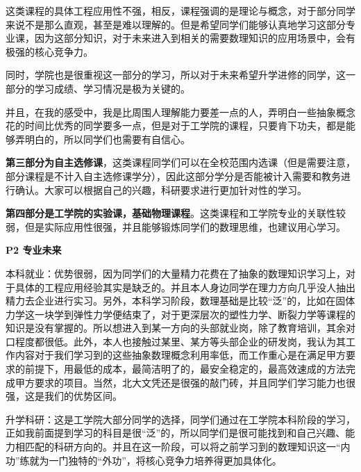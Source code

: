 \documentclass[11pt,oneside]{book}
\begin{document}
这类课程的具体工程应用性不强，相反，课程强调的是理论与概念，对于部分同学来说不是那么直观，甚至是难以理解的。但是希望同学们能够认真地学习这部分专业课，因为这部分知识，对于未来进入到相关的需要数理知识的应用场景中，会有极强的核心竞争力。

\vspace{10pt}

同时，学院也是很重视这一部分的学习，所以对于未来希望升学进修的同学，这一部分的学习成绩、学习情况是极为关键的。

\vspace{10pt}

并且，在我的感受中，我是比周围人理解能力要差一点的人，弄明白一些抽象概念花的时间比优秀的同学要多一点，但是对于工学院的课程，只要肯下功夫，都是能够弄明白的，所以同学们也需要有自信心。

\vspace{10pt}

\textbf{第三部分为自主选修课}，这类课程同学们可以在全校范围内选课（但是需要注意，部分课程是不计入自主选修课学分），因此这部分学分是否能被计入需要和教务进行确认。大家可以根据自己的兴趣，科研要求进行更加针对性的学习。

\vspace{10pt}

\textbf{第四部分是工学院的实验课，基础物理课程}。这类课程和工学院专业的关联性较弱，但是实际应用性很强，并且能够锻炼同学们的数理思维，也建议用心学习。

\vspace{10pt}

\textbf{P2 专业未来}

本科就业：优势很弱，因为同学们的大量精力花费在了抽象的数理知识学习上，对于具体的工程应用经验其实是缺乏的。并且本人身边同学在理力方向几乎没人抽出精力去企业进行实习。另外，本科学习阶段，数理基础是比较“泛”的，比如在固体力学这一块学到弹性力学便结束了，对于更深层次的塑性力学、断裂力学等课程的知识是没有掌握的。所以想进入到某一方向的头部就业岗，除了教育培训，其余对口程度都很低。此外，本人也接触过某里、某方等头部企业的研发岗，我认为其工作内容对于我们学习到的这些抽象数理概念利用率低，而工作重心是在满足甲方要求的前提下，用最低的成本，最简洁明了的，最安全稳定的，最高效速成的方法完成甲方要求的项目。当然，北大文凭还是很强的敲门砖，并且同学们学习能力也很强，这是我们的优势区间。

\vspace{10pt}

升学科研：这是工学院大部分同学的选择，同学们通过在工学院本科阶段的学习，正如我前面提到学习的科目是很“泛”的，所以同学们是很可能找到和自己兴趣、能力相匹配的科研方向的。并且在这一阶段，可以将之前学习到的数理知识这一“内功”练就为一门独特的“外功”，将核心竞争力培养得更加具体化。
 
\end{document}
